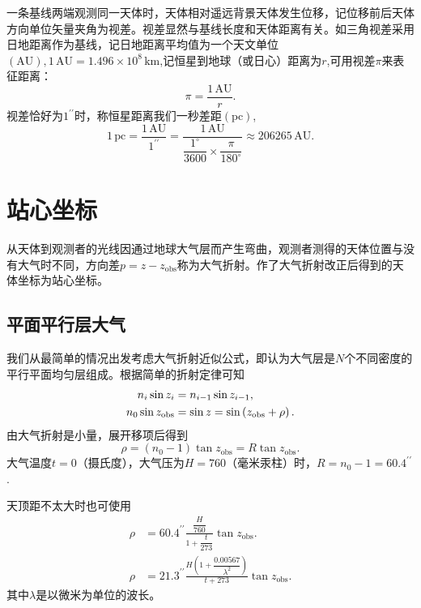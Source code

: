 \documentclass[11pt, a4paper, oneside]{ctexart}
\numberwithin{equation}{subsection}
\begin{document}
一条基线两端观测同一天体时，天体相对遥远背景天体发生位移，记位移前后天体方向单位矢量夹角为视差。视差显然与基线长度和天体距离有关。如三角视差采用日地距离作为基线，记日地距离平均值为一个天文单位$(\mathrm{AU}),1\,\mathrm{AU}=1.496\times10^{8}\,\mathrm{km}$,记恒星到地球（或日心）距离为$r$,可用视差$\pi$来表征距离：
\begin{equation}
\pi=\frac{1\,\mathrm{AU}}{r}.
\end{equation}
视差恰好为$1^{\prime\prime}$时，称恒星距离我们一秒差距$(\mathrm{pc})$,
\begin{equation}
1\,\mathrm{pc}=\frac{1\,\mathrm{AU}}{1^{\prime\prime}}=\frac{1\,\mathrm{AU}}{\dfrac{1^{\circ}}{3600}\times\dfrac{\pi}{180^{\circ}}}\approx206265\,\mathrm{AU}.
\end{equation}

\newpage
\section{站心坐标}
从天体到观测者的光线因通过地球大气层而产生弯曲，观测者测得的天体位置与没有大气时不同，方向差$p=z-z_{\text{obs}}$称为大气折射。作了大气折射改正后得到的天体坐标为站心坐标。

\subsection{平面平行层大气}
我们从最简单的情况出发考虑大气折射近似公式，即认为大气层是$N$个不同密度的平行平面均匀层组成。根据简单的折射定律可知
\begin{align}
n_i\sin z_i&=n_{i-1}\sin z_{i-1},\notag\\
n_0\sin z_{\text{obs}}&=\sin z=\sin\left(z_{\text{obs}}+\rho\right).\notag
\end{align}
由大气折射是小量，展开移项后得到
\begin{equation}
\rho=\left(n_0-1\right)\tan z_{\text{obs}}=R\tan z_{\text{obs}}.
\end{equation}
大气温度$t=0$（摄氏度），大气压为$H=760$（毫米汞柱）时，$R=n_0-1=60.4^{\prime\prime}$.

天顶距不太大时也可使用
\begin{align}
\rho&=60.4^{\prime\prime}\frac{\dfrac{H}{760}}{1+\dfrac{t}{273}}\tan z_{\text{obs}}.\\
\rho&=21.3^{\prime\prime}\frac{H\left(1+\dfrac{0.00567}{\lambda^2}\right)}{t+273}\tan z_{\text{obs}}.
\end{align}
其中$\lambda$是以微米为单位的波长。
\end{document}
